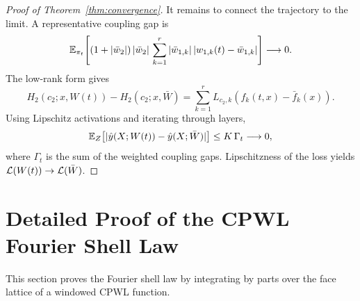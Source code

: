\begin{proof}[Proof of Theorem~\ref{thm:convergence}]
It remains to connect the trajectory to the limit. A representative coupling gap is
\begin{equation}
\mathbb{E}_{\pi_t}\!\left[
(1+|\bar w_2|)\,|\bar w_2|\,
\sum_{k=1}^{r}|\bar w_{1,k}|\,|w_{1,k}(t)-\bar w_{1,k}|
\right]\longrightarrow0.
\label{eq:channel-coupling-gap}
\end{equation}
The low-rank form gives
\begin{equation}
H_2(c_2;x,W(t))-H_2(c_2;x,\bar W)
=
\sum_{k=1}^r L_{c_2,k}
\left(f_k(t,x)-\bar f_k(x)\right).
\end{equation}
Using Lipschitz activations and iterating through layers,
\begin{equation}
\mathbb{E}_Z\!\left[
|\hat y(X;W(t))-\hat y(X;\bar W)|
\right]\le K\,\Gamma_t\longrightarrow0,
\label{eq:output-coupling-gap}
\end{equation}
where $\Gamma_t$ is the sum of the weighted coupling gaps. Lipschitzness of the loss yields $\mathcal{L}(W(t))\to\mathcal{L}(\bar W)$.
\end{proof}

\section{Detailed Proof of the CPWL Fourier Shell Law}
\label{app:cpwl-proof}

This section proves the Fourier shell law by integrating by parts over the face lattice of a windowed CPWL function.

